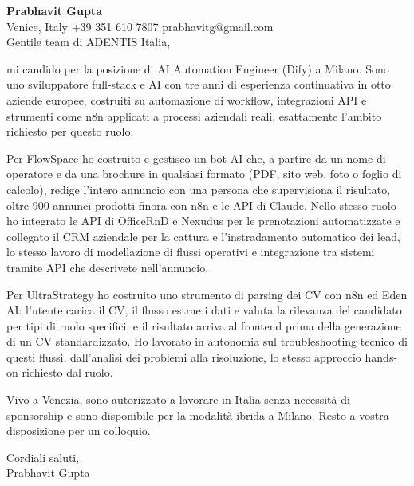 \documentclass[a4paper,10.5pt]{article}
\begin{document}
\textbf{Prabhavit Gupta}\\
Venice, Italy \textbar{} +39 351 610 7807 \textbar{} prabhavitg@gmail.com\\[10pt]
Gentile team di ADENTIS Italia,

mi candido per la posizione di AI Automation Engineer (Dify) a Milano. Sono uno sviluppatore full-stack e AI con tre anni di esperienza continuativa in otto aziende europee, costruiti su automazione di workflow, integrazioni API e strumenti come n8n applicati a processi aziendali reali, esattamente l'ambito richiesto per questo ruolo.

Per FlowSpace ho costruito e gestisco un bot AI che, a partire da un nome di operatore e da una brochure in qualsiasi formato (PDF, sito web, foto o foglio di calcolo), redige l'intero annuncio con una persona che supervisiona il risultato, oltre 900 annunci prodotti finora con n8n e le API di Claude. Nello stesso ruolo ho integrato le API di OfficeRnD e Nexudus per le prenotazioni automatizzate e collegato il CRM aziendale per la cattura e l'instradamento automatico dei lead, lo stesso lavoro di modellazione di flussi operativi e integrazione tra sistemi tramite API che descrivete nell'annuncio.

Per UltraStrategy ho costruito uno strumento di parsing dei CV con n8n ed Eden AI: l'utente carica il CV, il flusso estrae i dati e valuta la rilevanza del candidato per tipi di ruolo specifici, e il risultato arriva al frontend prima della generazione di un CV standardizzato. Ho lavorato in autonomia sul troubleshooting tecnico di questi flussi, dall'analisi dei problemi alla risoluzione, lo stesso approccio hands-on richiesto dal ruolo.

Vivo a Venezia, sono autorizzato a lavorare in Italia senza necessità di sponsorship e sono disponibile per la modalità ibrida a Milano. Resto a vostra disposizione per un colloquio.

Cordiali saluti,\\
Prabhavit Gupta
\end{document}
